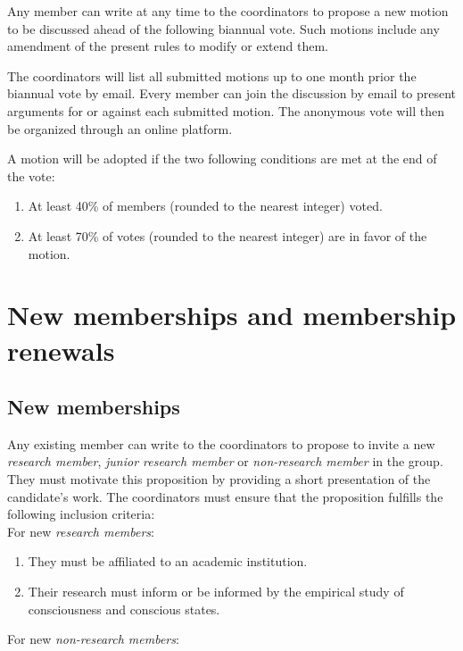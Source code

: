 \documentclass[a4paper, 11pt]{scrartcl}
\begin{document}
Any member can write at any time to the coordinators to propose a new motion to be discussed ahead of the following biannual vote. Such motions include any amendment of the present rules to modify or extend them. 

The coordinators will list all submitted motions up to one month prior the biannual vote by email. Every member can join the discussion by email to present arguments for or against each submitted motion. The anonymous vote will then be organized through an online platform. 

A motion will be adopted if the two following conditions are met at the end of the vote:

\begin{enumerate}
\item At least 40\% of members (rounded to the nearest integer) voted.
\item At least 70\% of votes (rounded to the nearest integer) are in favor of the motion.
\end{enumerate} 

\section{New memberships and membership renewals}

\subsection{New memberships}
\label{new_memberships}

Any existing member can write to the coordinators to propose to invite a new \emph{research member}, \emph{junior research member} or \emph{non-research member} in the group. They must motivate this proposition by providing a short presentation of the candidate's work. The coordinators must ensure that the proposition fulfills the following inclusion criteria: \\

For new \emph{research members}:

\begin{enumerate}
\item They must be affiliated to an academic institution. 
\item Their research must inform or be informed by the empirical study of consciousness and conscious states. 

\end{enumerate}


For new \emph{non-research members}:   
\end{document}
